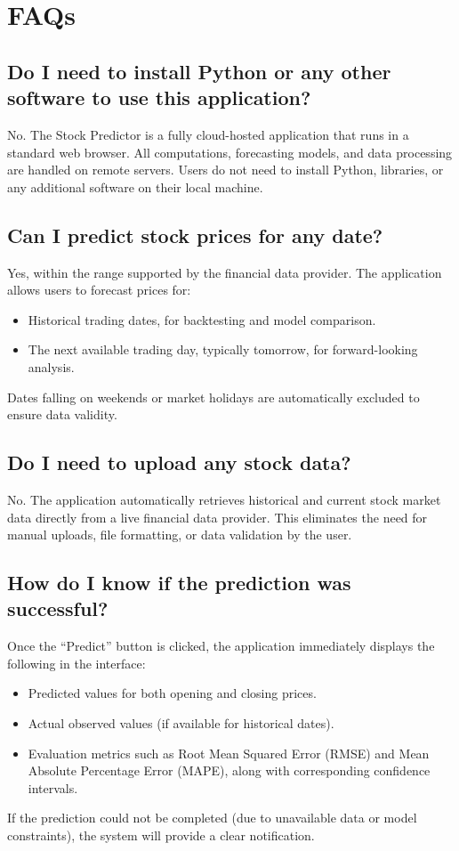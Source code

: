 %
%

\chapter{FAQs}

\section{Do I need to install Python or any other software to use this application?}
No. The Stock Predictor is a fully cloud-hosted application that runs in a standard web browser. All computations, forecasting models, and data processing are handled on remote servers. Users do not need to install Python, libraries, or any additional software on their local machine.

\section{Can I predict stock prices for any date?}
Yes, within the range supported by the financial data provider. The application allows users to forecast prices for:
\begin{itemize}
	\item Historical trading dates, for backtesting and model comparison.
	\item The next available trading day, typically tomorrow, for forward-looking analysis.
\end{itemize}
Dates falling on weekends or market holidays are automatically excluded to ensure data validity.

\section{Do I need to upload any stock data?}
No. The application automatically retrieves historical and current stock market data directly from a live financial data provider. This eliminates the need for manual uploads, file formatting, or data validation by the user.

\section{How do I know if the prediction was successful?}
Once the ``Predict'' button is clicked, the application immediately displays the following in the interface:
\begin{itemize}
	\item Predicted values for both opening and closing prices.
	\item Actual observed values (if available for historical dates).
	\item Evaluation metrics such as Root Mean Squared Error (RMSE) and Mean Absolute Percentage Error (MAPE), along with corresponding confidence intervals.
\end{itemize}
If the prediction could not be completed (due to unavailable data or model constraints), the system will provide a clear notification.

